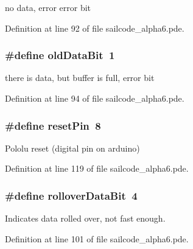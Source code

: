 no data, error error bit 



\-Definition at line 92 of file sailcode\-\_\-alpha6.\-pde.

\hypertarget{group__globalconstants_gaed67540d9d2621c3a21a0f6eb8b75d01}{
\subsubsection[{old\-Data\-Bit}]{\setlength{\rightskip}{0pt plus 5cm}\#define old\-Data\-Bit~1}}
\label{group__globalconstants_gaed67540d9d2621c3a21a0f6eb8b75d01}


there is data, but buffer is full, error bit 



\-Definition at line 94 of file sailcode\-\_\-alpha6.\-pde.

\hypertarget{group__globalconstants_gad67ff299260393832da3b34efaaee56a}{
\subsubsection[{reset\-Pin}]{\setlength{\rightskip}{0pt plus 5cm}\#define reset\-Pin~8}}
\label{group__globalconstants_gad67ff299260393832da3b34efaaee56a}


\-Pololu reset (digital pin on arduino) 



\-Definition at line 119 of file sailcode\-\_\-alpha6.\-pde.

\hypertarget{group__globalconstants_ga72f54d1e0beda470c8361ba984148900}{
\subsubsection[{rollover\-Data\-Bit}]{\setlength{\rightskip}{0pt plus 5cm}\#define rollover\-Data\-Bit~4}}
\label{group__globalconstants_ga72f54d1e0beda470c8361ba984148900}


\-Indicates data rolled over, not fast enough. 



\-Definition at line 101 of file sailcode\-\_\-alpha6.\-pde.

